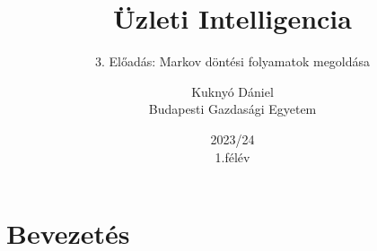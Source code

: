\documentclass[english, aspectratio=169]{beamer}
\makeatletter
\newcommand\makebeamertitle{\frame{\maketitle}}
\let\origtableofcontents=\tableofcontents
\def\tableofcontents{\@ifnextchar[{\origtableofcontents}{\gobbletableofcontents}}
\def\gobbletableofcontents#1{\origtableofcontents}
\makeatother
\begin{document}
\section{Bevezetés}
\title[]{Üzleti Intelligencia}
\subtitle{3. Előadás: Markov döntési folyamatok megoldása}
\author[Kuknyó Dániel]{Kuknyó Dániel\\Budapesti Gazdasági Egyetem}
\date{2023/24\\1.félév}
\makebeamertitle

\begin{frame}
\tableofcontents{}
\end{frame}

\begin{frame}
\tableofcontents[currentsection]
\end{frame}
\end{document}
